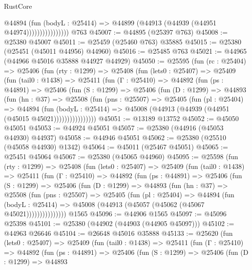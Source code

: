 \begin{lexlean}{RustCore}
\begin{coremodule}
                          @44894
                            (fun (bodyL : @25414) =>
                            @44899 (@44913 (@44939 (@44951 @44974))))))))))))))))
    @763
@45007 := @44895 (@25397 @763)
@45008 := @25380 @45007
@45011 := @25459 (@25460 @763) @35885
@45015 := @25380 (@25451 (@45011 @44956) @44960)
@45016 := @25485 @763
@45021 := @44965 (@44966 @45016 @35888 @44927 @44929)
@45050 := @25595
    (fun (rc : @25404) =>
    @25406
      (fun (rty : @1299) =>
      @25408
        (fun (lets0 : @25407) =>
        @25409
          (fun (tail0 : @1438) =>
          @25411
            (fun (Γ : @25410) =>
            @44892
              (fun (ps : @44891) =>
              @25406
                (fun (S : @1299) =>
                @25406
                  (fun (D : @1299) =>
                  @44893
                    (fun (hn : @37) =>
                    @25508
                      (fun (pns : @25507) =>
                      @25405
                        (fun (pl : @25404) =>
                        @44894
                          (fun (bodyL : @25414) =>
                          @45008 (@44913 (@44939 (@44951 (@45015 @45021))))))))))))))))
@45051 := @13189 @13752
@45052 := @45050 @45051
@45053 := @44924 @45051
@45057 := @25380 (@44916 (@45053 @44930) @44937)
@45058 := @44946 @45051
@45062 := @25380 (@25510 (@45058 @44930) @1342)
@45064 := @45011 (@25467 @45051)
@45065 := @25451 @45064
@45067 := @25380 (@45065 @44960)
@45095 := @25598
    (fun (rty : @1299) =>
    @25408
      (fun (lets0 : @25407) =>
      @25409
        (fun (tail0 : @1438) =>
        @25411
          (fun (Γ : @25410) =>
          @44892
            (fun (ps : @44891) =>
            @25406
              (fun (S : @1299) =>
              @25406
                (fun (D : @1299) =>
                @44893
                  (fun (hn : @37) =>
                  @25508
                    (fun (pns : @25507) =>
                    @25405
                      (fun (pl : @25404) =>
                      @44894
                        (fun (bodyL : @25414) =>
                        @45008 (@44913 (@45057 (@45062 (@45067 @45021)))))))))))))))
    @1565
@45096 := @44906 @1565
@45097 := @45096 @25398
@45101 := @25380 (@44902 (@44903 (@44905 @45097)))
@45102 := @44963 @26646
@45104 := @26648 @45016 @35888
@45133 := @25620
    (fun (lets0 : @25407) =>
    @25409
      (fun (tail0 : @1438) =>
      @25411
        (fun (Γ : @25410) =>
        @44892
          (fun (ps : @44891) =>
          @25406
            (fun (S : @1299) =>
            @25406
              (fun (D : @1299) =>
              @44893

\end{coremodule}
\end{lexlean}
